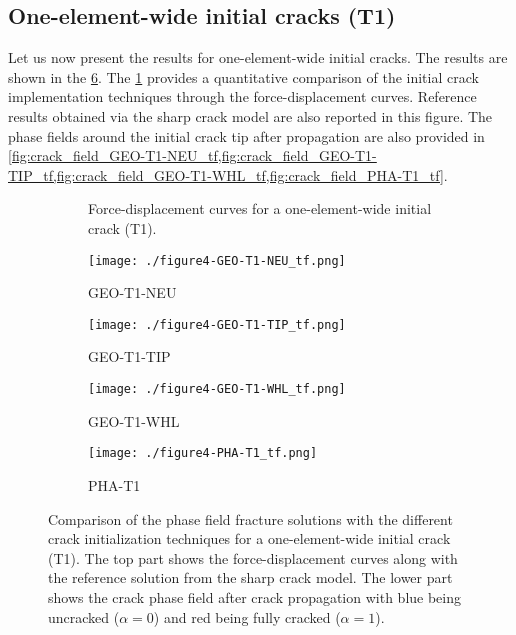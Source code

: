 \documentclass[OptSoft]{jtcam_preprint}
\begin{document}
\subsection{One-element-wide initial cracks (T1)}

Let us now present the results for one-element-wide initial cracks.
The results are shown in the \cref{fig:solutions_T1}.
The \cref{fig:Fu_T1} provides a quantitative comparison of the initial crack implementation techniques through the force-displacement curves.
Reference results obtained via the sharp crack model are also reported in this figure.
The phase fields around the initial crack tip after propagation are also provided in \cref{fig:crack_field_GEO-T1-NEU_tf,fig:crack_field_GEO-T1-TIP_tf,fig:crack_field_GEO-T1-WHL_tf,fig:crack_field_PHA-T1_tf}.

\begin{figure}
  \centering
  \begin{subfigure}{\textwidth}
    \centering
    
    \caption{Force-displacement curves for a one-element-wide initial crack (T1).}
    \label{fig:Fu_T1}
  \end{subfigure}
  \begin{subfigure}{0.49\textwidth}
    \centering
    \texttt{[image: ./figure4-GEO-T1-NEU\_tf.png]}
    \caption{GEO-T1-NEU}
    \label{fig:crack_field_GEO-T1-NEU_tf}
  \end{subfigure}
  \begin{subfigure}{0.49\textwidth}
    \centering
    \texttt{[image: ./figure4-GEO-T1-TIP\_tf.png]}
    \caption{GEO-T1-TIP}
    \label{fig:crack_field_GEO-T1-TIP_tf}
  \end{subfigure}
  \begin{subfigure}{0.49\textwidth}
    \centering
    \texttt{[image: ./figure4-GEO-T1-WHL\_tf.png]}
    \caption{GEO-T1-WHL}
    \label{fig:crack_field_GEO-T1-WHL_tf}
  \end{subfigure}
  \begin{subfigure}{0.49\textwidth}
    \centering
    \texttt{[image: ./figure4-PHA-T1\_tf.png]}
    \caption{PHA-T1}
    \label{fig:crack_field_PHA-T1_tf}
  \end{subfigure}
  \caption{Comparison of the phase field fracture solutions with the different crack initialization techniques for a one-element-wide initial crack (T1). The top part shows the force-displacement curves along with the reference solution from the sharp crack model. The lower part shows the crack phase field after crack propagation with blue being uncracked ($\alpha=0$) and red being fully cracked ($\alpha=1$).}
  \label{fig:solutions_T1}
\end{figure}
\end{document}
